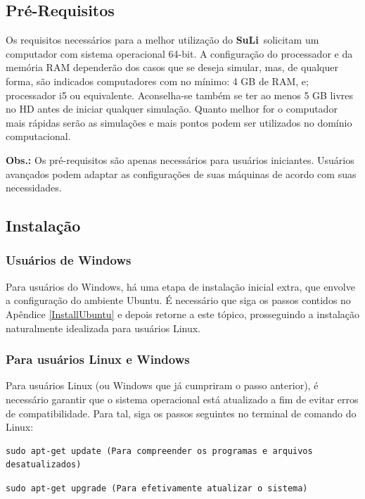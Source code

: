 \documentclass[12pt, a4paper]{article}
\newcommand{\SL}{{\bf SuLi}}
\begin{document}
\subsection{Pré-Requisitos}
Os requisitos necessários para a melhor utilização do \SL\ solicitam um computador com sistema operacional 64-bit. A configuração do processador e da memória RAM dependerão dos casos que se deseja simular, mas, de qualquer forma, são indicados computadores com no mínimo: 4 GB de RAM, e; processador i5 ou equivalente. Aconselha-se também se ter ao menos 5 GB livres no HD antes de iniciar qualquer simulação. Quanto melhor for o computador mais rápidas serão as simulações e mais pontos podem ser utilizados no domínio computacional. 

\textbf{Obs.:} Os pré-requisitos são apenas necessários para usuários iniciantes. Usuários avançados podem adaptar as configurações de suas máquinas de acordo com suas necessidades.

\subsection{Instalação}
\subsubsection{Usuários de Windows}	\label{WindowsUsers}
Para usuários do Windows, há uma etapa de instalação inicial extra, que envolve a configuração do ambiente Ubuntu. É necessário que siga os passos contidos no Apêndice \ref{InstallUbuntu} e depois retorne a este tópico, prosseguindo a instalação naturalmente idealizada para usuários Linux.

\subsubsection{Para usuários Linux e Windows}  \label{ContinueInstall}
Para usuários Linux (ou Windows que já cumpriram o passo anterior), é necessário garantir que o sistema operacional está atualizado a fim de evitar erros de compatibilidade. Para tal, siga os passos seguintes no terminal de comando do Linux:

\begin{verbatim}
sudo apt-get update (Para compreender os programas e arquivos desatualizados)
\end{verbatim}

\begin{verbatim}
sudo apt-get upgrade (Para efetivamente atualizar o sistema)
\end{verbatim}
\end{document}
